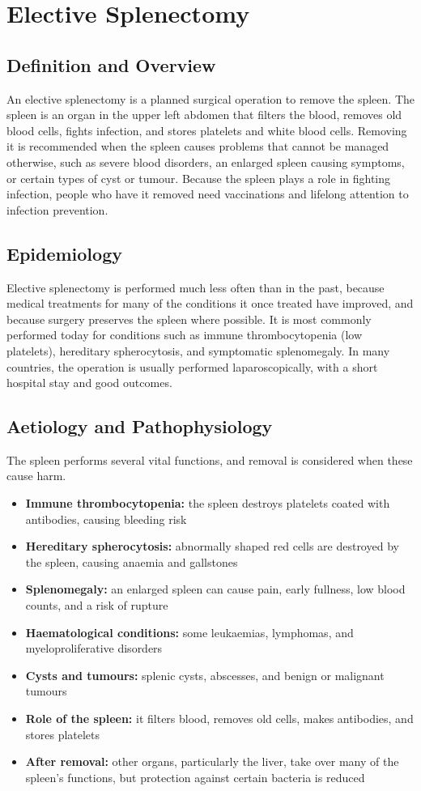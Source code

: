 \chapter{Elective Splenectomy}

\section*{Definition and Overview}
An elective splenectomy is a planned surgical operation to remove the spleen. The spleen is an organ in the upper left abdomen that filters the blood, removes old blood cells, fights infection, and stores platelets and white blood cells. Removing it is recommended when the spleen causes problems that cannot be managed otherwise, such as severe blood disorders, an enlarged spleen causing symptoms, or certain types of cyst or tumour. Because the spleen plays a role in fighting infection, people who have it removed need vaccinations and lifelong attention to infection prevention.

\section*{Epidemiology}
Elective splenectomy is performed much less often than in the past, because medical treatments for many of the conditions it once treated have improved, and because surgery preserves the spleen where possible. It is most commonly performed today for conditions such as immune thrombocytopenia (low platelets), hereditary spherocytosis, and symptomatic splenomegaly. In many countries, the operation is usually performed laparoscopically, with a short hospital stay and good outcomes.

\section*{Aetiology and Pathophysiology}
The spleen performs several vital functions, and removal is considered when these cause harm.
\begin{itemize}
    \item \textbf{Immune thrombocytopenia:} the spleen destroys platelets coated with antibodies, causing bleeding risk
    \item \textbf{Hereditary spherocytosis:} abnormally shaped red cells are destroyed by the spleen, causing anaemia and gallstones
    \item \textbf{Splenomegaly:} an enlarged spleen can cause pain, early fullness, low blood counts, and a risk of rupture
    \item \textbf{Haematological conditions:} some leukaemias, lymphomas, and myeloproliferative disorders
    \item \textbf{Cysts and tumours:} splenic cysts, abscesses, and benign or malignant tumours
    \item \textbf{Role of the spleen:} it filters blood, removes old cells, makes antibodies, and stores platelets
    \item \textbf{After removal:} other organs, particularly the liver, take over many of the spleen's functions, but protection against certain bacteria is reduced
\end{itemize}


